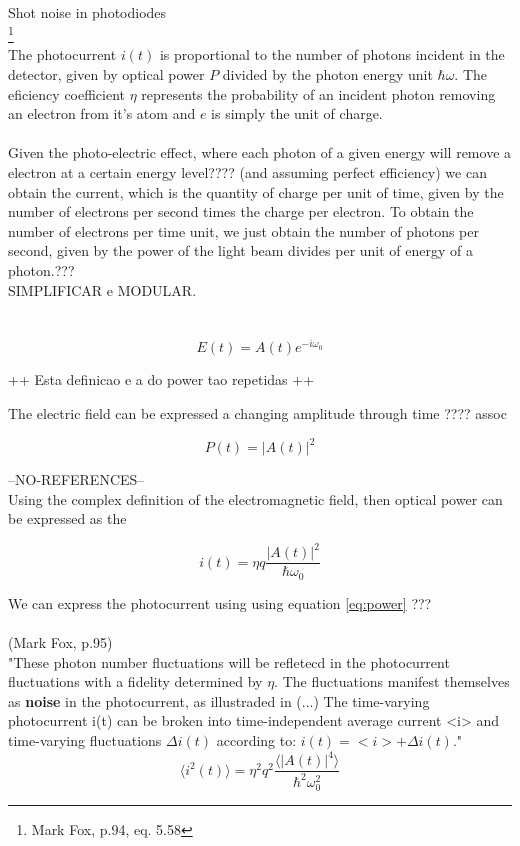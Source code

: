 \\
Shot noise in photodiodes\\
\footnote{Mark Fox, p.94, eq. 5.58}
\\
The photocurrent $i(t)$ is proportional to the number of photons incident in the detector, given by optical power $P$ divided by the photon energy unit $\hbar \omega$. The eficiency coefficient $\eta$ represents the probability of an incident photon removing an electron from it's atom and $e$ is simply the unit of charge.\\
\\
Given the photo-electric effect, where each photon of a given energy will remove a electron at a certain energy level???? (and assuming perfect efficiency) we can obtain the current, which is the quantity of charge per unit of time, given by the number of electrons per second times the charge per electron. To obtain the number of electrons per time unit, we just obtain the number of photons per second, given by the power of the light beam divides per unit of energy of a photon.???\\ SIMPLIFICAR e MODULAR.\\
\\
\\
\begin{equation}
	E(t) = A(t) e^{-i \omega_0}
\end{equation}

++ Esta definicao e a do power tao repetidas ++

The electric field can be expressed a changing amplitude through time ???? assoc


\begin{equation}
	P(t) = |A(t)|^2
	\label{eq:power}
\end{equation}

--NO-REFERENCES--\\
Using the complex definition of the electromagnetic field, then optical power can be expressed as the 

\begin{equation}
	i(t) = \eta q \frac{|A(t)|^2}{\hbar \omega_0}
\end{equation}

We can express the photocurrent using using equation \ref{eq:power} ???\\
\\
(Mark Fox, p.95)\\
"These photon number fluctuations will be refletecd in the photocurrent fluctuations with a fidelity determined by $\eta$. The fluctuations manifest themselves as {\bf noise} in the photocurrent, as illustraded in (...) The time-varying photocurrent i(t) can be broken into time-independent average current <i> and time-varying fluctuations $\Delta i (t)$ according to: $i(t) = <i> + \Delta i(t)$."
\\
\begin{equation}
	\langle i^2(t) \rangle = \eta^2 q^2 \frac{\langle |A(t)|^4 \rangle }{\hbar^2 \omega_0^2}
\end{equation}

